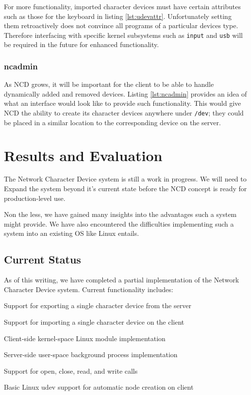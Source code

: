 \documentclass[11pt,twocolumn]{article}
\newenvironment{packed_item}{
\begin{itemize}
  \setlength{\itemsep}{1pt}
  \setlength{\parskip}{0pt}
  \setlength{\parsep}{0pt}
}{\end{itemize}}
\begin{document}
For more functionality, imported character devices must have certain
attributes such as those for the keyboard in listing \ref{lst:udevattr}.
Unfortunately setting them retroactively does not convince all programs
of a particular devices type. Therefore interfacing with specific kernel
subsystems such as \texttt{input} and \texttt{usb} will be required in
the future for enhanced functionality.

\subsubsection{ncadmin}



As NCD grows, it will be important for the client to be able to handle
dynamically added and removed devices. Listing \ref{lst:ncadmin}
provides an idea of what an interface would look like to provide such
functionality. This would give NCD the ability to create its character
devices anywhere under \texttt{/dev}; they could be placed in a similar
location to the corresponding device on the server.


\section{Results and Evaluation}
\label{sec:results}

The Network Character Device system is still a work in
progress. We will need to Expand the system beyond it's current state
before the NCD concept is ready for production-level use.

Non the less, we have gained many insights into the advantages such a
system might provide. We have also encountered the difficulties
implementing such a system into an existing OS like Linux entails.

\subsection{Current Status}
\label{sec:currentstatus}

As of this writing, we have completed a partial implementation of
the Network Character Device system. Current functionality includes:

\begin{packed_item}
\item Support for exporting a single character device from the server
\item Support for importing a single character device on the client
\item Client-side kernel-space Linux module implementation
\item Server-side user-space background process implementation
\item Support for open, close, read, and write calls
\item Basic Linux udev support for automatic node creation on client
\end{packed_item}
\end{document}
